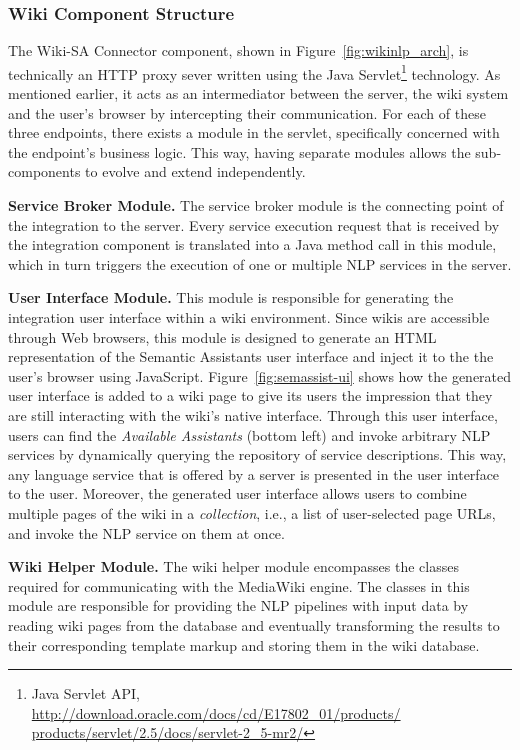 \subsubsection{Wiki Component Structure}
The Wiki-SA Connector component, shown in Figure~\ref{fig:wikinlp_arch}, is technically an HTTP proxy sever written using the Java Servlet\footnote{Java Servlet API, \url{http://download.oracle.com/docs/cd/E17802_01/products/ products/servlet/2.5/docs/servlet-2_5-mr2/}} technology. As mentioned earlier, it acts as an intermediator between the \sa server, the wiki system and the user's browser by intercepting their communication. For each of these three endpoints, there exists a module in the servlet, specifically concerned with the endpoint's business logic. This way, having separate modules allows the sub-components to evolve and extend independently.

\blankline
\noindent
\textbf{Service Broker Module. }{The service broker module is the connecting point of the integration to the \sa server. Every service execution request that is received by the integration component is translated into a Java method call in this module, which in turn triggers the execution of one or multiple NLP services in the \sa server.}

\blankline
\noindent
\textbf{User Interface Module. }{This module is responsible for generating the integration user interface within a wiki environment. Since wikis are accessible through Web browsers, this module is designed to generate an HTML representation of the Semantic Assistants user interface and inject it to the the user's browser using JavaScript. Figure~\ref{fig:semassist-ui} shows how the generated user interface is added to a wiki page to give its users the impression that they are still interacting with the wiki's native interface. Through this user interface, users can find the \emph{Available Assistants} (bottom left) and invoke arbitrary NLP services by dynamically querying the \sa repository of service descriptions. This way, any language service that is offered by a \sa server is presented in the user interface to the user. Moreover, the generated user interface allows users to combine multiple pages of the wiki in a \emph{collection}, i.e., a list of user-selected page URLs, and invoke the NLP service on them at once.}

\blankline
\noindent
\textbf{Wiki Helper Module. }{The wiki helper module encompasses the classes required for communicating with the MediaWiki engine. The classes in this module are responsible for providing the NLP pipelines with input data by reading wiki pages from the database and eventually transforming the results to their corresponding template markup and storing them in the wiki database.}



